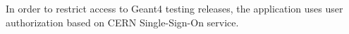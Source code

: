 In order to restrict access to Geant4 testing releases, the application uses user authorization based on CERN Single-Sign-On service.





